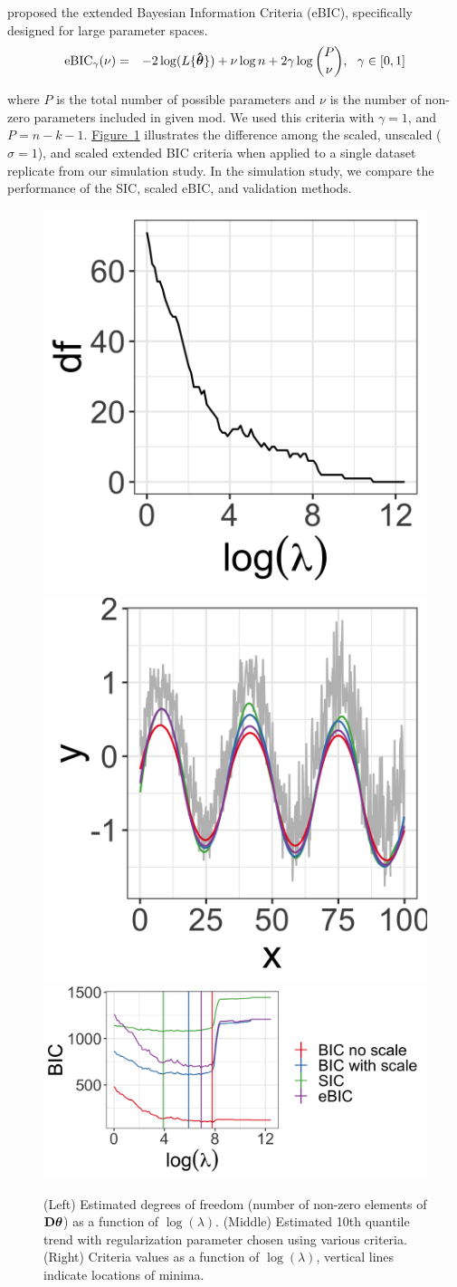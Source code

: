 \documentclass[aoas]{imsart}
\newcommand{\Fig}[1]{\hyperref[fig:#1]{Figure~\ref*{fig:#1}}} %
\newcommand{\Fig}[1]{{Figure~\ref{fig:#1}}} %
\newcommand{\V}[1]{{\bm{\mathbf{\MakeLowercase{#1}}}}} %
\newcommand{\Vhat}[1]{{\bm{\hat \mathbf{\MakeLowercase{#1}}}}} %
\newcommand{\M}[1]{{\bm{\mathbf{\MakeUppercase{#1}}}}} %
\begin{document}
\cite{chen2008} proposed the extended Bayesian Information Criteria (eBIC), specifically designed for large parameter spaces.
\begin{eqnarray*}
	\label{eq:eBIC}
	\mbox{eBIC}_{\gamma}(\nu) & = & -2\log(L\{\Vhat{\theta}\}) + \nu\log n  + 2\gamma\log{P \choose \nu},~~\gamma \in [0,1]
\end{eqnarray*}

where $P$ is the total number of possible parameters and $\nu$ is the number of non-zero parameters included in given mod. We used this criteria with $\gamma = 1$, and $P=n-k-1$. \Fig{BIC} illustrates the difference among the scaled, unscaled ($\sigma = 1$), and scaled extended BIC criteria
when applied to a single dataset replicate from our simulation study. In the simulation study, we compare the performance of the SIC, scaled eBIC, and validation methods. 

\begin{figure}[h!]
	\includegraphics[width = 0.25\linewidth]{Figures/df_by_lambda.png}
	\includegraphics[width = 0.25\linewidth]{Figures/BIC_data.png}
	\includegraphics[width = 0.5\linewidth]{Figures/BIC_by_lambda.png}
	\caption{(Left) Estimated degrees of freedom (number of non-zero elements of $\M{D}\V{\theta}$) as a function of $\log(\lambda)$. (Middle) Estimated 10th quantile trend with regularization parameter chosen using various criteria. (Right) Criteria values as a function of $\log(\lambda)$, vertical lines indicate locations of minima.}
	\label{fig:BIC}
\end{figure}
\end{document}
